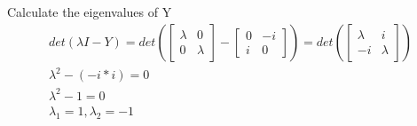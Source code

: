 \documentclass[]{article}
\begin{document}
\begin{enumerate}
\begin{enumerate}
          Calculate the eigenvalues of Y
          \begin{gather*}
            det(\lambda I - Y) = det(
            \begin{bmatrix}
              \lambda & 0\\
              0 & \lambda
            \end{bmatrix}
            - 
            \begin{bmatrix}
              0 & -i\\
              i & 0
            \end{bmatrix}
            ) = 
            det (
            \begin{bmatrix}
              \lambda & i\\
              -i & \lambda 
            \end{bmatrix}
            )\\
            \lambda^2 - (-i*i) = 0\\
            \lambda^2 - 1 = 0\\
            \lambda_1 = 1, \lambda_2 = -1
          \end{gather*}


\end{enumerate}
\end{enumerate}
\end{document}
